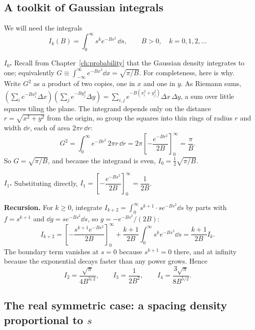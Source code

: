 \subsection{A toolkit of Gaussian integrals}

We will need the integrals
\begin{equation}
I_k(B)=\int_0^\infty s^k e^{-Bs^2}\,\dd s,\qquad B>0,\quad k=0,1,2,\dots
\label{eq:level-statistics-Ik}
\end{equation}

\textbf{$I_0$.} Recall from Chapter~\ref{ch:probability} that the Gaussian density integrates to one; equivalently $G\equiv\int_{-\infty}^{\infty}e^{-Bx^2}\dd x=\sqrt{\pi/B}$. For completeness, here is why. Write $G^2$ as a product of two copies, one in $x$ and one in $y$. As Riemann sums, $\left(\sum_i e^{-Bx_i^2}\Delta x\right)\left(\sum_j e^{-By_j^2}\Delta y\right)=\sum_{i,j}e^{-B(x_i^2+y_j^2)}\Delta x\,\Delta y$, a sum over little squares tiling the plane. The integrand depends only on the distance $r=\sqrt{x^2+y^2}$ from the origin, so group the squares into thin rings of radius $r$ and width $\dd r$, each of area $2\pi r\,\dd r$:
\begin{equation}
G^2=\int_0^\infty e^{-Br^2}\,2\pi r\,\dd r=2\pi\left[-\frac{e^{-Br^2}}{2B}\right]_0^\infty=\frac{\pi}{B}.
\end{equation}
So $G=\sqrt{\pi/B}$, and because the integrand is even, $I_0=\tfrac12\sqrt{\pi/B}$.

\textbf{$I_1$.} Substituting directly, $I_1=\left[-\dfrac{e^{-Bs^2}}{2B}\right]_0^\infty=\dfrac{1}{2B}$.

\textbf{Recursion.} For $k\ge0$, integrate $I_{k+2}=\int_0^\infty s^{k+1}\cdot s e^{-Bs^2}\dd s$ by parts with $f=s^{k+1}$ and $\dd g=se^{-Bs^2}\dd s$, so $g=-e^{-Bs^2}/(2B)$:
\begin{equation}
I_{k+2}=\left[-\frac{s^{k+1}e^{-Bs^2}}{2B}\right]_0^\infty+\frac{k+1}{2B}\int_0^\infty s^ke^{-Bs^2}\dd s=\frac{k+1}{2B}I_k .
\end{equation}
The boundary term vanishes at $s=0$ because $s^{k+1}=0$ there, and at infinity because the exponential decays faster than any power grows. Hence
\begin{equation}
I_2=\frac{\sqrt\pi}{4B^{3/2}},\qquad I_3=\frac{1}{2B^2},\qquad I_4=\frac{3\sqrt\pi}{8B^{5/2}}.
\label{eq:level-statistics-I234}
\end{equation}

\subsection{The real symmetric case: a spacing density proportional to $s$}

